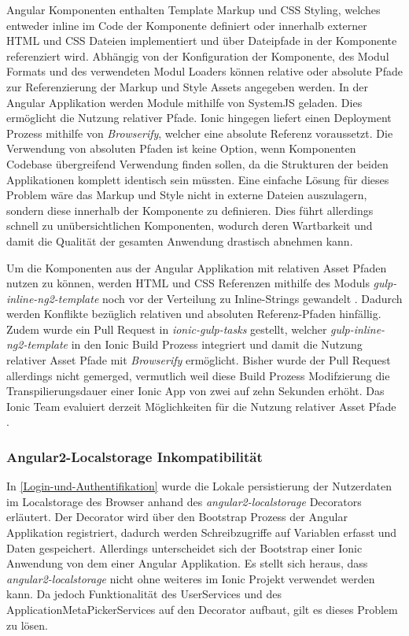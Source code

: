 Angular Komponenten enthalten Template Markup und \ac{CSS} Styling, welches entweder inline im Code der Komponente
definiert oder innerhalb externer \ac{HTML} und \ac{CSS} Dateien implementiert und über Dateipfade in der Komponente referenziert wird.
Abhängig von der Konfiguration der Komponente, des Modul Formats und des verwendeten Modul Loaders
können relative oder absolute Pfade zur Referenzierung der Markup und Style Assets angegeben werden.
In der Angular Applikation werden Module mithilfe von SystemJS geladen. Dies ermöglicht die Nutzung relativer Pfade.
Ionic hingegen liefert einen Deployment Prozess mithilfe von \emph{Browserify}, welcher eine absolute Referenz voraussetzt.
Die Verwendung von absoluten Pfaden ist keine Option, wenn Komponenten Codebase übergreifend Verwendung finden sollen,
da die Strukturen der beiden Applikationen komplett identisch sein müssten.
Eine einfache Lösung für dieses Problem wäre das Markup und Style nicht in externe Dateien auszulagern,
sondern diese innerhalb der Komponente zu definieren.
Dies führt allerdings schnell zu unübersichtlichen Komponenten,
wodurch deren Wartbarkeit und damit die Qualität der gesamten Anwendung drastisch abnehmen kann.

Um die Komponenten aus der Angular Applikation mit relativen Asset Pfaden nutzen zu können,
werden \ac{HTML} und \ac{CSS} Referenzen mithilfe des Moduls \emph{gulp-inline-ng2-template} noch vor der Verteilung zu Inline-Strings gewandelt \cite{ludoh30:online}.
Dadurch werden Konflikte bezüglich relativen und absoluten Referenz-Pfaden hinfällig.
Zudem wurde ein Pull Request in \emph{ionic-gulp-tasks} gestellt, welcher \emph{gulp-inline-ng2-template}
in den Ionic Build Prozess integriert und damit die Nutzung relativer Asset Pfade mit \emph{Browserify} ermöglicht.
Bisher wurde der Pull Request allerdings nicht gemerged, vermutlich weil diese Build Prozess Modifzierung die
Transpilierungsdauer einer Ionic App von zwei auf zehn Sekunden erhöht.
Das Ionic Team evaluiert derzeit Möglichkeiten für die Nutzung relativer Asset Pfade \cite{relat31:online}.

\subsubsection{Angular2-Localstorage Inkompatibilität}
In \ref{Login-und-Authentifikation} wurde die Lokale persistierung der Nutzerdaten im Localstorage
des Browser anhand des \emph{angular2-localstorage} Decorators erläutert.
Der Decorator wird über den Bootstrap Prozess der Angular Applikation registriert,
dadurch werden Schreibzugriffe auf Variablen erfasst und Daten gespeichert.
Allerdings unterscheidet sich der Bootstrap einer Ionic Anwendung von dem einer Angular Applikation.
Es stellt sich heraus, dass \emph{angular2-localstorage} nicht ohne weiteres im Ionic Projekt verwendet werden kann.
Da jedoch Funktionalität des UserServices und des ApplicationMetaPickerServices auf den Decorator aufbaut,
gilt es dieses Problem zu lösen.


